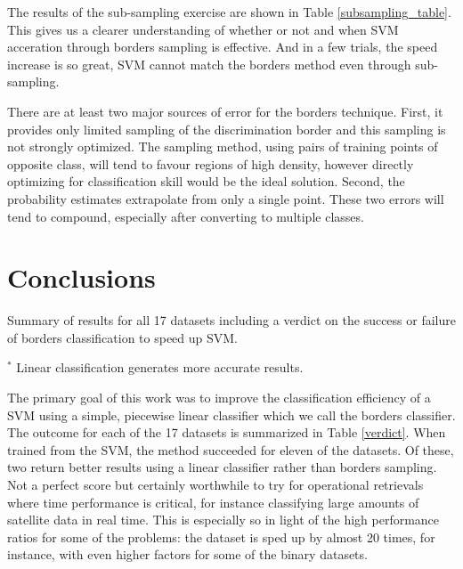 The results of the sub-sampling exercise are shown in Table \ref{subsampling_table}.
This gives us a clearer understanding of whether or not and
when SVM acceration through borders sampling is effective.
And in a few trials, the speed increase is so great, SVM cannot match the borders
method even through sub-sampling.

There are at least two major sources of error for the borders technique.
First, it provides only limited sampling of the discrimination
border and this sampling is not strongly optimized.
The sampling method, using pairs of training points of opposite class, will
tend to favour regions of high density, however  
directly optimizing for classification skill would be the ideal solution.
Second, the probability estimates extrapolate from only a single point.
These two errors will tend to compound, especially after converting to
multiple classes.

\section{Conclusions}

\label{conclusion}

\begin{table}
	\caption{Summary of results for all 17 datasets including a verdict on the success or failure of borders classification to speed up SVM.}
	\label{verdict}
	

	\vspace{1 ex}

	\raggedright 
	$^*$ Linear classification generates more accurate results.
\end{table}

The primary goal of this work was to improve the classification efficiency of a SVM
using a simple, piecewise linear classifier which we call the borders classifier.
The outcome for each of the 17 datasets is summarized in Table \ref{verdict}.
When trained from the SVM, the method succeeded for eleven of the datasets.
Of these, two return better results using a linear classifier rather than
borders sampling.
Not a perfect score but certainly worthwhile to try for operational retrievals
where time performance is critical, 
for instance classifying large amounts of satellite data in real time.
This is especially so in light of the high performance ratios for some of the problems:
the  dataset is sped up by almost 20 times,
for instance, with even higher factors for some of the binary datasets.

